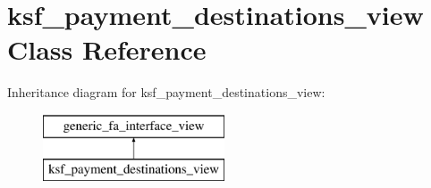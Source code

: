 \hypertarget{classksf__payment__destinations__view}{}\section{ksf\+\_\+payment\+\_\+destinations\+\_\+view Class Reference}
\label{classksf__payment__destinations__view}
Inheritance diagram for ksf\+\_\+payment\+\_\+destinations\+\_\+view\+:\begin{figure}[H]
\begin{center}
\leavevmode
\includegraphics[height=2.000000cm]{d2/d0a/classksf__payment__destinations__view}
\end{center}
\end{figure}
